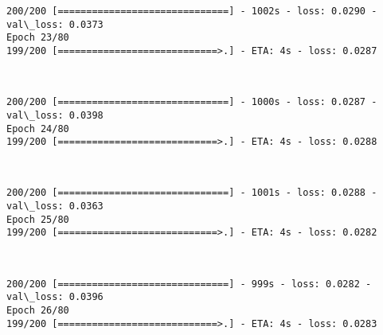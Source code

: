 \documentclass[11pt]{article}
\begin{document}
    \begin{Verbatim}[commandchars=\\\{\}]
200/200 [==============================] - 1002s - loss: 0.0290 - val\_loss: 0.0373
Epoch 23/80
199/200 [============================>.] - ETA: 4s - loss: 0.0287
    \end{Verbatim}

    \begin{center}
    \end{center}
    { \hspace*{\fill} \\}
    
    \begin{Verbatim}[commandchars=\\\{\}]
200/200 [==============================] - 1000s - loss: 0.0287 - val\_loss: 0.0398
Epoch 24/80
199/200 [============================>.] - ETA: 4s - loss: 0.0288
    \end{Verbatim}

    \begin{center}
    \end{center}
    { \hspace*{\fill} \\}
    
    \begin{Verbatim}[commandchars=\\\{\}]
200/200 [==============================] - 1001s - loss: 0.0288 - val\_loss: 0.0363
Epoch 25/80
199/200 [============================>.] - ETA: 4s - loss: 0.0282
    \end{Verbatim}

    \begin{center}
    \end{center}
    { \hspace*{\fill} \\}
    
    \begin{Verbatim}[commandchars=\\\{\}]
200/200 [==============================] - 999s - loss: 0.0282 - val\_loss: 0.0396
Epoch 26/80
199/200 [============================>.] - ETA: 4s - loss: 0.0283
    \end{Verbatim}

    \begin{center}
    \end{center}
    { \hspace*{\fill} \\}
    
\end{document}
